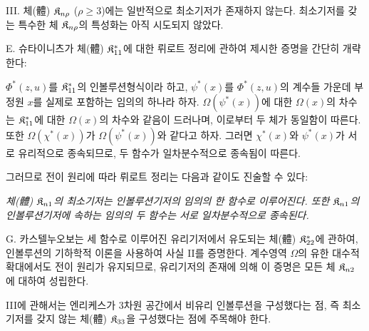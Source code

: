 III. 체(體) $\mathfrak K_{n\rho}$ ($\rho\ge3$)에는 일반적으로 최소기저가 존재하지 않는다. 최소기저를 갖는 특수한 체 $\mathfrak K_{n\rho}$의 특성화는 아직 시도되지 않았다.

E. 슈타이니츠가 체(體) $\mathfrak K^*_{11}$에 대한 뤼로트 정리에 관하여 제시한 증명을 간단히 개략한다:

$\Phi^*(z,u)$를 $\mathfrak K^*_{11}$의 인볼루션형식이라 하고, $\psi^*(x)$를 $\Phi^*(z,u)$의 계수들 가운데 부정원 $x$를 실제로 포함하는 임의의 하나라 하자. $\Omega(\psi^*(x))$에 대한 $\Omega(x)$의 차수는 $\mathfrak K^*_{11}$에 대한 $\Omega(x)$의 차수와 같음이 드러나며, 이로부터 두 체가 동일함이 따른다. 또한 $\Omega(\chi^*(x))$가 $\Omega(\psi^*(x))$와 같다고 하자. 그러면 $\chi^*(x)$와 $\psi^*(x)$가 서로 유리적으로 종속되므로, 두 함수가 일차분수적으로 종속됨이 따른다.

그러므로 전이 원리에 따라 뤼로트 정리는 다음과 같이도 진술할 수 있다:

\emph{체(體) $\mathfrak K_{n1}$의 최소기저는 인볼루션기저의 임의의 한 함수로 이루어진다. 또한 $\mathfrak K_{n1}$의 인볼루션기저에 속하는 임의의 두 함수는 서로 일차분수적으로 종속된다.}

G. 카스텔누오보는 세 함수로 이루어진 유리기저에서 유도되는 체(體) $\mathfrak K^*_{22}$에 관하여, 인볼루션의 기하학적 이론을 사용하여 사실 II를 증명한다. 계수영역 $\Omega$의 유한 대수적 확대에서도 전이 원리가 유지되므로, 유리기저의 존재에 의해 이 증명은 모든 체 $\mathfrak K_{n2}$에 대하여 성립한다.

III에 관해서는 엔리케스가 3차원 공간에서 비유리 인볼루션을 구성했다는 점, 즉 최소기저를 갖지 않는 체(體) $\mathfrak K_{33}$을 구성했다는 점에 주목해야 한다.

